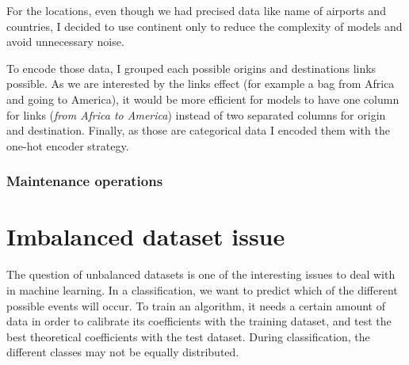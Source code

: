\documentclass[12pt]{article}
\begin{document}
For the locations, even though we had precised data like name of airports and countries, I decided to use continent only to reduce the complexity of models and avoid unnecessary noise. 

\noindent To encode those data, I grouped each possible origins and destinations links possible. As we are interested by the links effect (for example a bag from Africa and going to America), it would be more efficient for models to have one column for links (\textit{from Africa to America}) instead of two separated columns for origin and destination. Finally, as those are categorical data I encoded them with the one-hot encoder strategy.




\newpage
\subsubsection{Maintenance operations}


\newpage
\section{Imbalanced dataset issue}\label{section:Imbalanced dataset issue}

The question of unbalanced datasets is one of the interesting issues to deal with in machine learning. In a classification, we want to predict which of the different possible events will occur. To train an algorithm, it needs a certain amount of data in order to calibrate its coefficients with the training dataset, and test the best theoretical coefficients with the test dataset. During classification, the different classes may not be equally distributed.
\end{document}
